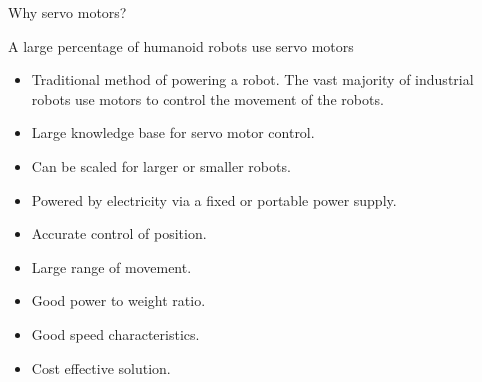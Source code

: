 \documentclass[compress]{beamer}
\begin{document}
\begin{frame}{Why servo motors?}

    A large percentage of humanoid robots use servo motors

    \begin{itemize}

        \item Traditional method of powering a robot. The vast majority of
            industrial robots use motors to control the movement of the robots.
        \item Large knowledge base for servo motor control.
        \item Can be scaled for larger or smaller robots.
        \item Powered by electricity via a fixed or portable power supply.
        \item Accurate control of position.
        \item Large range of movement.
        \item Good power to weight ratio.
        \item Good speed characteristics.
        \item Cost effective solution.
    \end{itemize}

\end{frame}
\end{document}

